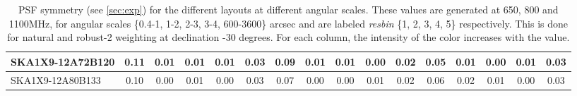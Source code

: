 \begin{table}[htp]
{{\begin{tabular}{|lccccc||ccccc||ccccc|}
SKA1X9-12A72B120 & 0.11 \cellcolor{blue!39.00} & 0.01 \cellcolor{red!28.50} & 0.01 \cellcolor{green!39.00} & 0.01 \cellcolor{orange!60.00} & 0.03 \cellcolor{purple!18.00} & 0.09 \cellcolor{blue!39.00} & 0.01 \cellcolor{red!32.00} & 0.01 \cellcolor{green!60.00} & 0.00 \cellcolor{orange!18.00} & 0.02 \cellcolor{purple!18.00} & 0.05 \cellcolor{blue!18.00} & 0.01 \cellcolor{red!18.00} & 0.00 \cellcolor{green!18.00} & 0.01 \cellcolor{orange!60.00} & 0.03 \cellcolor{purple!18.00}\\ \hline 
SKA1X9-12A80B133 & 0.10 \cellcolor{blue!18.00} & 0.00 \cellcolor{red!18.00} & 0.01 \cellcolor{green!39.00} & 0.00 \cellcolor{orange!18.00} & 0.03 \cellcolor{purple!18.00} & 0.07 \cellcolor{blue!18.00} & 0.00 \cellcolor{red!18.00} & 0.00 \cellcolor{green!18.00} & 0.01 \cellcolor{orange!60.00} & 0.02 \cellcolor{purple!18.00} & 0.06 \cellcolor{blue!39.00} & 0.02 \cellcolor{red!60.00} & 0.01 \cellcolor{green!60.00} & 0.00 \cellcolor{orange!18.00} & 0.03 \cellcolor{purple!18.00}\\ \hline 
\end{tabular}}
\vspace{-0.300000cm}
\hspace{1cm} 

\vspace{.25cm}
\caption{PSF symmetry (see \autoref{sec:exp})  for the different layouts at different angular scales. These values are generated at 650, 800 and 1100MHz, for angular scales \{0.4-1, 1-2, 2-3, 3-4, 600-3600\} arcsec and are labeled {\it resbin} \{1, 2, 3, 4, 5\} respectively. This is done for natural and robust-2 weighting at declination -30 degrees. For each column, the intensity of the color increases with the value.}\label{tab:psf_sym}}
 \end{table}
